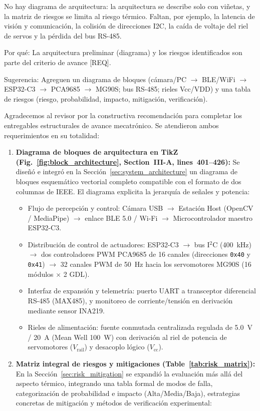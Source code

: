 \documentclass{LabDSTresponse}
\begin{document}
{No hay diagrama de arquitectura: la arquitectura se describe solo con viñetas, y la matriz de riesgos se limita al riesgo térmico. Faltan, por ejemplo, la latencia de visión y comunicación, la colisión de direcciones I2C, la caída de voltaje del riel de servos y la pérdida del bus RS-485.

Por qué: La arquitectura preliminar (diagrama) y los riesgos identificados son parte del criterio de avance [REQ].

Sugerencia: Agreguen un diagrama de bloques (cámara/PC $\to$ BLE/WiFi $\to$ ESP32-C3 $\to$ PCA9685 $\to$ MG90S; bus RS-485; rieles Vcc/VDD) y una tabla de riesgos (riesgo, probabilidad, impacto, mitigación, verificación).}
{Agradecemos al revisor por la constructiva recomendación para completar los entregables estructurales de avance mecatrónico. Se atendieron ambos requerimientos en su totalidad:
\begin{enumerate}
    \item \textbf{Diagrama de bloques de arquitectura en TikZ (Fig.~\ref{fig:block_architecture}, Section~III-A, lines~401--426):} Se diseñó e integró en la Sección~\ref{sec:system_architecture} un diagrama de bloques esquemático vectorial completo compatible con el formato de dos columnas de IEEE. El diagrama explicita la jerarquía de señales y potencia:
    \begin{itemize}
        \item Flujo de percepción y control: Cámara USB $\to$ Estación Host (OpenCV / MediaPipe) $\to$ enlace BLE 5.0 / Wi-Fi $\to$ Microcontrolador maestro ESP32-C3.
        \item Distribución de control de actuadores: ESP32-C3 $\to$ bus I$^2$C (400~kHz) $\to$ dos controladores PWM PCA9685 de 16 canales (direcciones \texttt{0x40} y \texttt{0x41}) $\to$ 32 canales PWM de 50~Hz hacia los servomotores MG90S (16 módulos $\times$ 2 GDL).
        \item Interfaz de expansión y telemetría: puerto UART a transceptor diferencial RS-485 (MAX485), y monitoreo de corriente/tensión en derivación mediante sensor INA219.
        \item Rieles de alimentación: fuente conmutada centralizada regulada de 5.0~V / 20~A (Mean Well 100~W) con derivación al riel de potencia de servomotores ($V_{\text{rail}}$) y desacoplo lógico ($V_{\text{cc}}$).
    \end{itemize}
    \item \textbf{Matriz integral de riesgos y mitigaciones (Table~\ref{tab:risk_matrix}):} En la Sección~\ref{sec:risk_mitigation} se expandió la evaluación más allá del aspecto térmico, integrando una tabla formal de modos de falla, categorización de probabilidad e impacto (Alta/Media/Baja), estrategias concretas de mitigación y métodos de verificación experimental:

\end{enumerate}}
\end{document}
